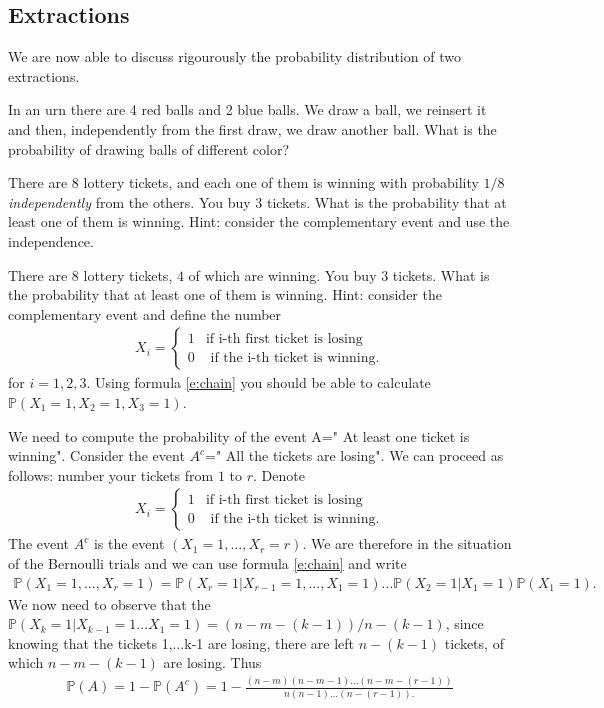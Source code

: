 \documentclass[12pt]{article}
\newcommand{\<}{{\langle \!\! \langle}}
\renewcommand{\>}{{\rangle \!\! \rangle}}
\newcommand{\bel}[2]{\begin{equation} \label{#1} \begin{split} #2
 					\end{split} \end{equation}}
\begin{document}
\subsection{ Extractions}
We are now able to discuss rigourously the probability distribution of two extractions. 

\begin{ExerciseList}

\Exercise In an urn there are 4 red balls and 2 blue balls. We draw a ball, we reinsert it and then, independently from the first draw, we draw another ball. What is the probability of drawing balls of different color? 

\Exercise  There are $8$ lottery tickets, and each one of them is winning with probability $1/8$ \emph{independently} from the others. You buy $3$ tickets. What is the probability that at least one of them is winning.  Hint: consider the complementary event and use the independence. 

\Exercise There are $8$ lottery tickets, $4$ of which are winning. You buy $3$ tickets. What is the probability that at least one of them is winning.  Hint: consider the complementary event and
define the number \bel{}{X_i=\begin{cases}
1 & \textrm{if i-th first ticket is losing }\\
0 & \textrm{ if the i-th ticket is winning}.
\end{cases}
} for $i=1,2,3$. Using formula \eqref{e:chain} you should be able to calculate $\mathbb{P}(X_1=1,X_2=1,X_3=1)$.

\Answer We need to compute the probability of the event A=" At least one ticket is winning". Consider the event $A^c$=" All the tickets are losing". We can proceed as follows: number your tickets from $1$ to $r$. Denote  
\bel{}{X_i=\begin{cases}
1 & \textrm{if i-th first ticket is losing }\\
0 & \textrm{ if the i-th ticket is winning}.
\end{cases}
}
The event $A^c$ is the event $(X_1=1,...,X_r=r)$. We are therefore in the situation of the Bernoulli trials and we can use formula \eqref{e:chain} and write 
\bel{}{\mathbb{P}(X_1=1,...,X_r=1)=\mathbb{P}(X_r=1|X_{r-1}=1,...,X_1=1)...\mathbb{P}(X_2=1|X_1=1)\mathbb{P}(X_1=1).}
We now need to observe that the $\mathbb{P}(X_k=1|X_{k-1}=1...X_1=1)=(n-m-(k-1))/n-(k-1)$, since knowing that the tickets 1,...k-1 are losing, there are left  $n-(k-1)$ tickets, of which  $n-m-(k-1)$ are losing. Thus
\bel{}{\mathbb{P}(A)=1-\mathbb{P}(A^c)=1-\frac{(n-m)(n-m-1)...(n-m-(r-1))}{n(n-1)...(n-(r-1)).}}

\end{ExerciseList}
\end{document}
